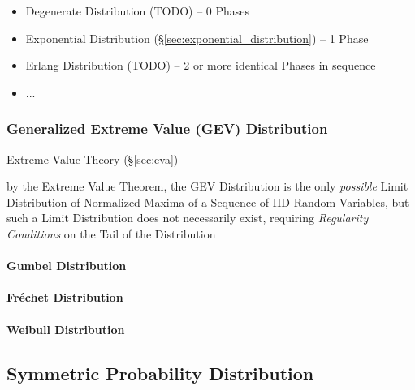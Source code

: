 \begin{itemize}
  \item Degenerate Distribution (TODO) -- 0
    Phases
  \item Exponential Distribution (\S\ref{sec:exponential_distribution}) -- 1
    Phase
  \item Erlang Distribution (TODO) -- 2 or more identical Phases in sequence
  \item ...
\end{itemize}



\subsubsection{Generalized Extreme Value (GEV) Distribution}\label{sec:gev}

Extreme Value Theory (\S\ref{sec:eva})

by the Extreme Value Theorem, the GEV Distribution is the only \emph{possible}
Limit Distribution of Normalized Maxima of a Sequence of IID Random Variables,
but such a Limit Distribution does not necessarily exist, requiring
\emph{Regularity Conditions} on the Tail of the Distribution



\paragraph{Gumbel Distribution}\label{sec:gumbel_distribution}\hfill

\paragraph{Fr\'echet Distribution}\label{sec:frechet_distribution}\hfill

\paragraph{Weibull Distribution}\label{sec:weibull_distribution}\hfill



\subsection{Symmetric Probability Distribution}
\label{sec:symmetric_probability}

